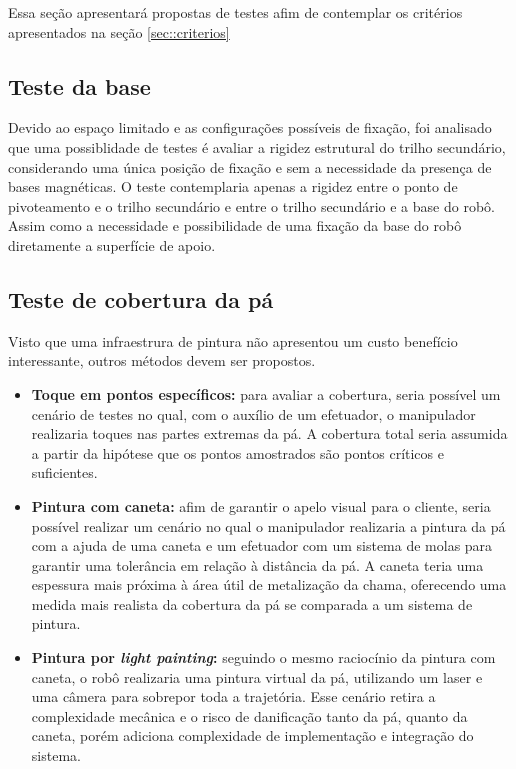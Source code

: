 Essa seção apresentará propostas de testes afim de contemplar os critérios
apresentados na seção \ref{sec::criterios}

\subsection{Teste da base}
Devido ao espaço limitado e as configurações
possíveis de fixação, foi analisado que uma possiblidade de testes é avaliar a rigidez estrutural do trilho secundário, 
considerando uma única posição de fixação e sem a necessidade da presença de bases magnéticas. 
O teste contemplaria apenas a rigidez entre o ponto de pivoteamento e o trilho secundário e entre o 
trilho secundário e a base do robô. Assim como a necessidade e possibilidade de uma fixação da base do 
robô diretamente a superfície de apoio.

\subsection{Teste de cobertura da pá}

Visto que uma infraestrura de pintura não apresentou um custo benefício
interessante, outros métodos devem ser propostos.

\begin{itemize}
  \item \textbf{Toque em pontos específicos:} para avaliar a cobertura, seria
  possível um cenário de testes no qual, com o auxílio de um efetuador, o
  manipulador realizaria toques nas partes extremas da pá. A cobertura total
  seria assumida a partir da hipótese que os pontos amostrados são  pontos
  críticos e suficientes.
  \item  \textbf{Pintura com caneta:} afim de garantir o apelo visual para o
  cliente, seria possível realizar um cenário no qual o manipulador realizaria a
  pintura da pá com a ajuda de uma caneta e um efetuador com um sistema de molas
  para garantir uma tolerância em relação à distância da pá. A caneta teria uma
  espessura mais próxima à área útil de metalização da chama, oferecendo uma
  medida mais realista da cobertura da pá se comparada a um sistema de
  pintura.
  \item \textbf{Pintura por \textit{light painting}:} seguindo o mesmo
  raciocínio da pintura com caneta, o robô realizaria uma pintura virtual da pá,
  utilizando um laser e uma câmera para sobrepor toda a trajetória. Esse cenário
  retira a complexidade mecânica e o risco de danificação tanto da pá, quanto da
  caneta, porém adiciona complexidade de implementação e integração do sistema.
\end{itemize}

